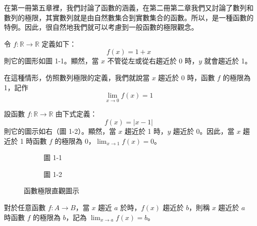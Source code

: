在第一冊第五章裡，我們討論了函數的涵義，在第二冊第二章我們又討論了數列和數列的極限，其實數列就是由自然數集合到實數集合的函數。所以，是一種函數的特例。因此，很自然地我們就可以考慮到一般函數的極限觀念。

\begin{example}\label{ex:b6-app4-1}
令 $f: \mathbb{R}\to\mathbb{R}$ 定義如下：
\[ f(x) = 1+x \]
則它的圖形如圖 1-1。顯然，當 $x$ 不管從左或從右趨近於 0 時，$y$ 就會趨近於 1。

在這種情形，仿照數列極限的定義，我們就說當 $x$ 趨近於 0 時，函數 $f$ 的極限為 1，記作
\[ \lim_{x\to 0} f(x) = 1 \]
\end{example}

\begin{example}\label{ex:b6-app4-2}
設函數 $f: \mathbb{R}\to\mathbb{R}$ 由下式定義：
\[ f(x) = |x-1| \]
則它的圖示如右（圖 1-2）。顯然，當 $x$ 趨近於 1 時，$y$ 趨近於 0。因此，當 $x$ 趨近於 1 時函數 $f$ 的極限為 0，$\lim_{x\to 1} f(x) = 0$。
\end{example}

\begin{figure}[H]
\centering
\begin{subfigure}[b]{0.45\textwidth}
\centering
{}
\caption{圖 1-1}
\end{subfigure}
\begin{subfigure}[b]{0.45\textwidth}
\centering
{}
\caption{圖 1-2}
\end{subfigure}
\caption{函數極限直觀圖示}
\label{fig:b6-app4-limit-intro}
\end{figure}

對於任意函數 $f: A\to B$，當 $x$ 趨近 $a$ 於時，$f(x)$ 趨近於 $b$，則稱 $x$ 趨近於 $a$ 時函數 $f$ 的極限為 $b$，記為 $\lim_{x\to a} f(x) = b$。

